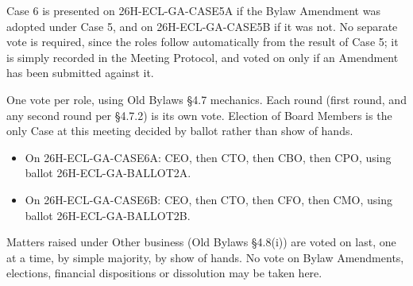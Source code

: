 \documentclass{../../../Common/Latex/Templates/rapport}
\begin{document}
Case 6 is presented on 26H-ECL-GA-CASE5A if the Bylaw Amendment was adopted under Case 5, and on 26H-ECL-GA-CASE5B if it was not. No separate vote is required, since the roles follow automatically from the result of Case 5; it is simply recorded in the Meeting Protocol, and voted on only if an Amendment has been submitted against it.

One vote per role, using Old Bylaws \S4.7 mechanics. Each round (first round, and any second round per \S4.7.2) is its own vote. Election of Board Members is the only Case at this meeting decided by ballot rather than show of hands.
\begin{itemize}
  \item On 26H-ECL-GA-CASE6A: CEO, then CTO, then CBO, then CPO, using ballot 26H-ECL-GA-BALLOT2A.
  \item On 26H-ECL-GA-CASE6B: CEO, then CTO, then CFO, then CMO, using ballot 26H-ECL-GA-BALLOT2B.
\end{itemize}

Matters raised under Other business (Old Bylaws \S4.8(i)) are voted on last, one at a time, by simple majority, by show of hands. No vote on Bylaw Amendments, elections, financial dispositions or dissolution may be taken here.
\end{document}
